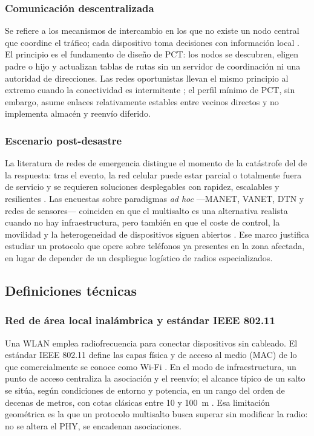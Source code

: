 \documentclass[12pt,oneside]{scrreprt}
\begin{document}
\subsubsection{Comunicación descentralizada}

Se refiere a los mecanismos de intercambio en los que no existe un nodo central que coordine el tráfico; cada dispositivo toma decisiones con información local \parencite{Conti2014}. El principio es el fundamento de diseño de PCT: los nodos se descubren, eligen padre o hijo y actualizan tablas de rutas sin un servidor de coordinación ni una autoridad de direcciones. Las redes oportunistas llevan el mismo principio al extremo cuando la conectividad es intermitente \parencite{Conti2010}; el perfil mínimo de PCT, sin embargo, asume enlaces relativamente estables entre vecinos directos y no implementa almacén y reenvío diferido.

\subsubsection{Escenario post-desastre}

La literatura de redes de emergencia distingue el momento de la catástrofe del de la respuesta: tras el evento, la red celular puede estar parcial o totalmente fuera de servicio y se requieren soluciones desplegables con rapidez, escalables y resilientes \parencite{Miranda2016}. Las encuestas sobre paradigmas \emph{ad hoc} ---MANET, VANET, DTN y redes de sensores--- coinciden en que el multisalto es una alternativa realista cuando no hay infraestructura, pero también en que el coste de control, la movilidad y la heterogeneidad de dispositivos siguen abiertos \parencite{Reina2015}. Ese marco justifica estudiar un protocolo que opere sobre teléfonos ya presentes en la zona afectada, en lugar de depender de un despliegue logístico de radios especializados.

\subsection{Definiciones técnicas}
\label{sec:definiciones-tecnicas}

\subsubsection{Red de área local inalámbrica y estándar IEEE 802.11}

Una WLAN emplea radiofrecuencia para conectar dispositivos sin cableado. El estándar IEEE 802.11 define las capas física y de acceso al medio (MAC) de lo que comercialmente se conoce como Wi-Fi \parencite{IEEE2020}. En el modo de infraestructura, un punto de acceso centraliza la asociación y el reenvío; el alcance típico de un salto se sitúa, según condiciones de entorno y potencia, en un rango del orden de decenas de metros, con cotas clásicas entre 10 y 100~m \parencite{Gupta2000}. Esa limitación geométrica es la que un protocolo multisalto busca superar sin modificar la radio: no se altera el PHY, se encadenan asociaciones.
\end{document}
